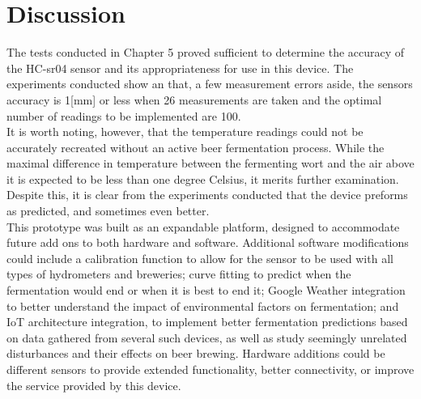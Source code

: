 \documentclass[twoside]{ctuthesis}
\theoremstyle{plain}
\theoremstyle{definition}
\theoremstyle{note}
\begin{document}
\section{Discussion}
The tests conducted in Chapter 5 proved sufficient to determine the accuracy of the HC-sr04 sensor and its appropriateness for use in this device.	The experiments conducted show an that, a few measurement errors aside, the sensors accuracy is 1[mm] or less when 26 measurements are taken and the optimal number of readings to be implemented are 100.\\
It is worth noting, however, that the temperature readings could not be accurately recreated without an active beer fermentation process. While the maximal difference in temperature between the fermenting wort and the air above it is expected to be less than one degree Celsius\cite{Thermodynamics_Brewers}, it merits further examination. Despite this, it is clear from the experiments conducted that the device preforms as predicted, and sometimes even better.\\
This prototype was built as an expandable platform, designed to accommodate future add ons to both hardware and software. Additional software modifications could include a calibration function to allow for the sensor to be used with all types of hydrometers and breweries; curve fitting to predict when the fermentation would end or when it is best to end it; Google Weather integration to better understand the impact of environmental factors on fermentation; and IoT architecture integration, to implement better fermentation predictions based on data gathered from several such devices, as well as study seemingly unrelated disturbances and their effects on beer brewing.
Hardware additions could be different sensors to provide extended functionality, better connectivity, or improve the service provided by this device.

\pagebreak
\end{document}
